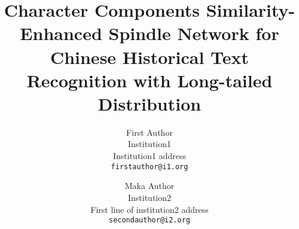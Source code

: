 \documentclass[10pt,twocolumn,letterpaper]{article}
\title{Character Components Similarity-Enhanced Spindle Network for Chinese Historical Text Recognition with Long-tailed Distribution}
\author{First Author\\
Institution1\\
Institution1 address\\
{\tt\small firstauthor@i1.org}
\and
Maka Author\\
Institution2\\
First line of institution2 address\\
{\tt\small secondauthor@i2.org}
}
\begin{document}
\maketitle

    


%




{
    \small
    
    
}


% 
\end{document}
